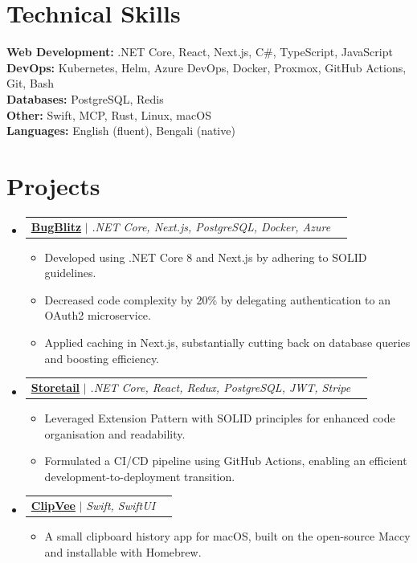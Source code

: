 \documentclass[letterpaper,11pt]{article}
\makeatletter
\newcommand{\resumeItem}[1]{
  \item\small{
    {#1 \vspace{-2pt}}
  }
}
\newcommand{\resumeProjectHeading}[2]{
    \item
    \begin{tabular*}{0.97\textwidth}{l@{\extracolsep{\fill}}r}
      \small#1 & #2 \\
    \end{tabular*}\vspace{-7pt}
}
\newcommand{\resumeSubHeadingListStart}{\begin{itemize}[leftmargin=0.15in, label={}]}
\newcommand{\resumeSubHeadingListEnd}{\end{itemize}}
\newcommand{\resumeItemListStart}{\begin{itemize}}
\newcommand{\resumeItemListEnd}{\end{itemize}\vspace{-5pt}}
\makeatother
\begin{document}
\section{Technical Skills}
 \begin{itemize}[leftmargin=0.15in, label={}]
    \small{\item{
     \textbf{Web Development:} .NET Core, React, Next.js, C\#, TypeScript, JavaScript \\
    \textbf{DevOps:} Kubernetes, Helm, Azure DevOps, Docker, Proxmox, GitHub Actions, Git, Bash \\
    \textbf{Databases:} PostgreSQL, Redis  \\
    \textbf{Other:} Swift, MCP, Rust, Linux, macOS \\
    \textbf{Languages:} English (fluent), Bengali (native) \\
    }}
 \end{itemize}
 

\section{Projects}
  \resumeSubHeadingListStart
  \resumeProjectHeading
    {{\href{https://github.com/mzbali/bugblitz}{\textbf{BugBlitz}}} $|$ \emph{.NET Core, Next.js, PostgreSQL, Docker, Azure}}{}
  \resumeItemListStart
    \resumeItem{Developed using .NET Core 8 and Next.js by adhering to SOLID guidelines.}
\resumeItem{Decreased code complexity by 20\% by delegating authentication to an OAuth2 microservice.}
\resumeItem{Applied caching in Next.js, substantially cutting back on database queries and boosting efficiency.}
  \resumeItemListEnd
  
    \resumeProjectHeading
      {{\href{https://github.com/mzbali/storetail}{\textbf{Storetail}}} $|$ \emph{.NET Core, React, Redux, PostgreSQL, JWT, Stripe}}{}
      \resumeItemListStart
        \resumeItem{Leveraged Extension Pattern with SOLID principles for enhanced code organisation and readability.}
        \resumeItem{Formulated a CI/CD pipeline using GitHub Actions, enabling an efficient development-to-deployment transition.}
      \resumeItemListEnd

    \resumeProjectHeading
      {{\href{https://github.com/mzbali/ClipVee}{\textbf{ClipVee}}} $|$ \emph{Swift, SwiftUI}}{}
      \resumeItemListStart
        \resumeItem{A small clipboard history app for macOS, built on the open-source Maccy and installable with Homebrew.}
      \resumeItemListEnd

    \resumeSubHeadingListEnd
\end{document}

